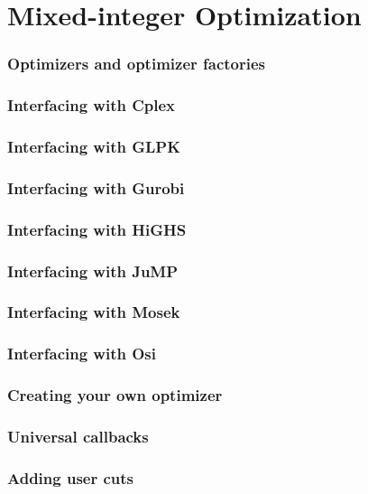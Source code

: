 \part{Mixed-integer Optimization}



\section{Optimizers and optimizer factories}
\section{Interfacing with \textsf{Cplex}}
\section{Interfacing with \textsf{GLPK}}
\section{Interfacing with \textsf{Gurobi}}
\section{Interfacing with \textsf{HiGHS}}
\section{Interfacing with \textsf{JuMP}}
\section{Interfacing with \textsf{Mosek}}
\section{Interfacing with \textsf{Osi}}
\section{Creating your own optimizer}

\section{Universal callbacks}
\section{Adding user cuts}
